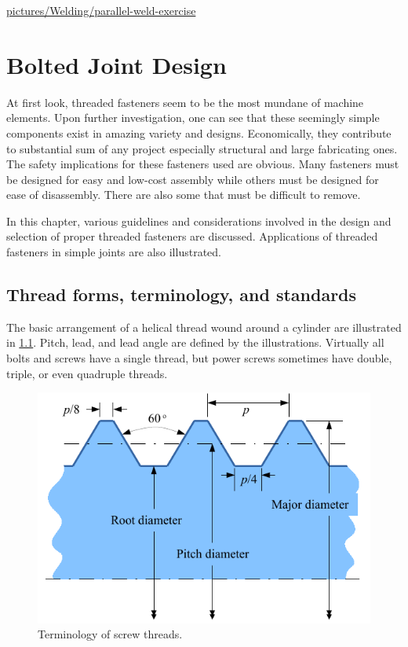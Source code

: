 \documentclass[a4paper,openany,12pt]{book}
\begin{document}
{{\url{pictures/Welding/parallel-weld-exercise}

\chapter{Bolted Joint Design}
\label{bolted-joint-design}
At first look, threaded fasteners seem to be the most mundane of machine
elements. Upon further investigation, one can see that these seemingly
simple components exist in amazing variety and designs. Economically,
they contribute to substantial sum of any project especially structural
and large fabricating ones. The safety implications for these fasteners
used are obvious. Many fasteners must be designed for easy and low-cost
assembly while others must be designed for ease of disassembly. There
are also some that must be difficult to remove.

In this chapter, various guidelines and considerations involved in the
design and selection of proper threaded fasteners are discussed.
Applications of threaded fasteners in simple joints are also
illustrated.

\section{Thread forms, terminology, and standards}
\label{thread-forms-terminology-and-standards}
The basic arrangement of a helical thread wound around a cylinder are
illustrated in  \ref{fig: bolt terms}. Pitch, lead, and
lead angle are defined by the illustrations. Virtually all bolts and
screws have a single thread, but power screws sometimes have double,
triple, or even quadruple threads.


\begin{figure}[htbp]
\centering
\includegraphics[width=.9\linewidth]{pictures/Bolt/bolt-terminology.pdf}
\caption{\label{fig: bolt terms}Terminology of screw threads.}
\end{figure}

}}
\end{document}
